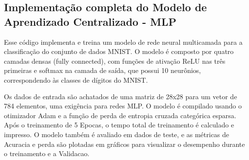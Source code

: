 \subsection{Implementação completa do Modelo de Aprendizado Centralizado - MLP}

Esse código implementa e treina um modelo de rede neural multicamada para a classificação do conjunto de dados MNIST. O modelo é composto por quatro camadas densas (fully connected), com funções de ativação ReLU nas três primeiras e softmax na camada de saída, que possui 10 neurônios, correspondendo às classes de dígitos do MNIST.

Os dados de entrada são achatados de uma matriz de 28x28 para um vetor de 784 elementos, uma exigência para redes MLP. O modelo é compilado usando o otimizador Adam e a função de perda de entropia cruzada categórica esparsa. Após o treinamento de 5 Epocas, o tempo total de treinamento é calculado e impresso. O modelo também é avaliado em dados de teste, e as métricas de Acuracia e perda são plotadas em gráficos para visualizar o desempenho durante o treinamento e a Validacao.

